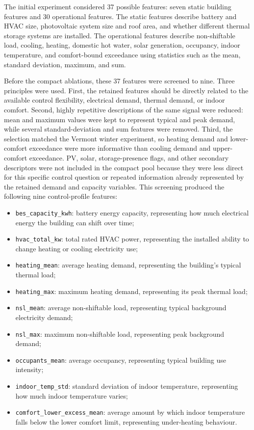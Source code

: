 The initial experiment considered 37 possible features: seven static building
features and 30 operational features. The static features describe battery and
HVAC size, photovoltaic system size and roof area, and whether different thermal
storage systems are installed. The operational features describe non-shiftable
load, cooling, heating, domestic hot water, solar generation, occupancy, indoor
temperature, and comfort-bound exceedance using statistics such as the mean,
standard deviation, maximum, and sum.

Before the compact ablations, these 37 features were screened to nine. Three
principles were used. First, the retained features should be directly related to
the available control flexibility, electrical demand, thermal demand, or indoor
comfort. Second, highly repetitive descriptions of the same signal were reduced:
mean and maximum values were kept to represent typical and peak demand, while
several standard-deviation and sum features were removed. Third, the selection
matched the Vermont winter experiment, so heating demand and lower-comfort
exceedance were more informative than cooling demand and upper-comfort
exceedance. PV, solar, storage-presence flags, and other secondary descriptors
were not included in the compact pool because they were less direct for this
specific control question or repeated information already represented by the
retained demand and capacity variables. This screening produced the following
nine control-profile features:
\begin{itemize}
  \item \texttt{bes\_capacity\_kwh}: battery energy capacity, representing how much
  electrical energy the building can shift over time;
  \item \texttt{hvac\_total\_kw}: total rated HVAC power, representing the installed
  ability to change heating or cooling electricity use;
  \item \texttt{heating\_mean}: average heating demand, representing the building's
  typical thermal load;
  \item \texttt{heating\_max}: maximum heating demand, representing its peak thermal
  load;
  \item \texttt{nsl\_mean}: average non-shiftable load, representing typical
  background electricity demand;
  \item \texttt{nsl\_max}: maximum non-shiftable load, representing peak background
  demand;
  \item \texttt{occupants\_mean}: average occupancy, representing typical building
  use intensity;
  \item \texttt{indoor\_temp\_std}: standard deviation of indoor temperature,
  representing how much indoor temperature varies;
  \item \texttt{comfort\_lower\_excess\_mean}: average amount by which indoor
  temperature falls below the lower comfort limit, representing under-heating
  behaviour.
\end{itemize}

